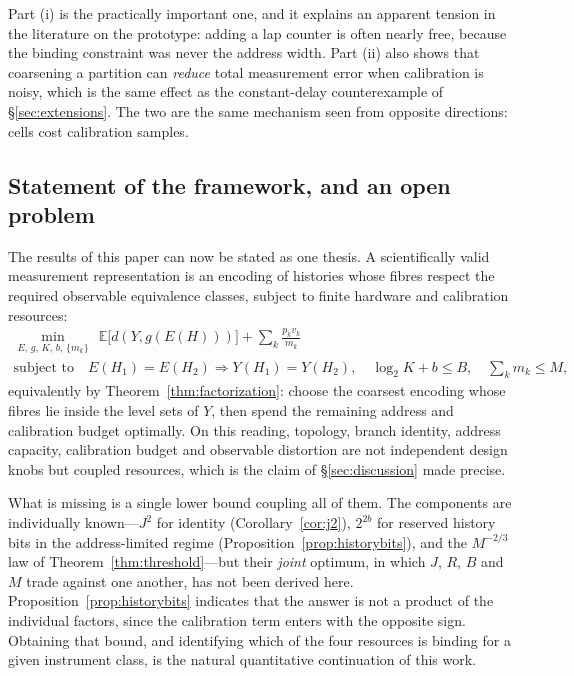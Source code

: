 \documentclass[11pt]{article}
\begin{document}
Part (i) is the practically important one, and it explains an apparent tension in the
literature on the prototype: adding a lap counter is often nearly free, because the binding
constraint was never the address width. Part (ii) also shows that coarsening a partition can
\emph{reduce} total measurement error when calibration is noisy, which is the same effect as
the constant-delay counterexample of \S\ref{sec:extensions}. The two are the same mechanism
seen from opposite directions: cells cost calibration samples.

\subsection{Statement of the framework, and an open problem}

The results of this paper can now be stated as one thesis. A scientifically valid
measurement representation is an encoding of histories whose fibres respect the required
observable equivalence classes, subject to finite hardware and calibration resources:
\begin{equation}
\boxed{
\begin{gathered}
\min_{E,\,g,\,K,\,b,\,\{m_k\}}\ \ \mathbb{E}\bigl[d(Y,g(E(H)))\bigr]+\sum_k\frac{p_kv_k}{m_k}\\
\text{subject to}\quad E(H_1)=E(H_2)\Rightarrow Y(H_1)=Y(H_2),\quad
\log_2K+b\le B,\quad \sum_k m_k\le M,
\end{gathered}}
\end{equation}
equivalently by Theorem~\ref{thm:factorization}: choose the coarsest encoding whose fibres
lie inside the level sets of $Y$, then spend the remaining address and calibration budget
optimally. On this reading, topology, branch identity, address capacity, calibration budget
and observable distortion are not independent design knobs but coupled resources, which is
the claim of \S\ref{sec:discussion} made precise.

What is missing is a single lower bound coupling all of them. The components are
individually known---$J^{2}$ for identity (Corollary~\ref{cor:j2}),
$2^{2b}$ for reserved history bits in the address-limited regime
(Proposition~\ref{prop:historybits}), and the $M^{-2/3}$ law of
Theorem~\ref{thm:threshold}---but their \emph{joint} optimum, in which $J$, $R$, $B$ and $M$
trade against one another, has not been derived here. Proposition~\ref{prop:historybits}
indicates that the answer is not a product of the individual factors, since the calibration
term enters with the opposite sign. Obtaining that bound, and identifying which of the four
resources is binding for a given instrument class, is the natural quantitative continuation
of this work.
\end{document}
